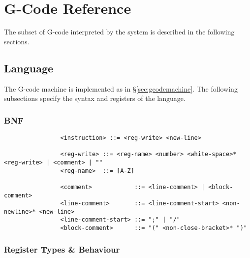 \chapter{G-Code Reference}
	
	The subset of G-code interpreted by the system is described in the following
	sections.
	
	\section{Language}
		
		The G-code machine is implemented as in \S\ref{sec:gcodemachine}. The following
		subsections specify the syntax and registers of the language.
		
		\subsection{BNF}
			
			\label{sec:gcodebnf}
			
			\begin{verbatim}
				<instruction> ::= <reg-write> <new-line>
				
				<reg-write> ::= <reg-name> <number> <white-space>* <reg-write> | <comment> | ""
				<reg-name>  ::= [A-Z]
				
				<comment>            ::= <line-comment> | <block-comment>
				<line-comment>       ::= <line-comment-start> <non-newline>* <new-line> 
				<line-comment-start> ::= ";" | "/"
				<block-comment>      ::= "(" <non-close-bracket>* ")"
			\end{verbatim}
		
		\subsection{Register Types \& Behaviour}
			
